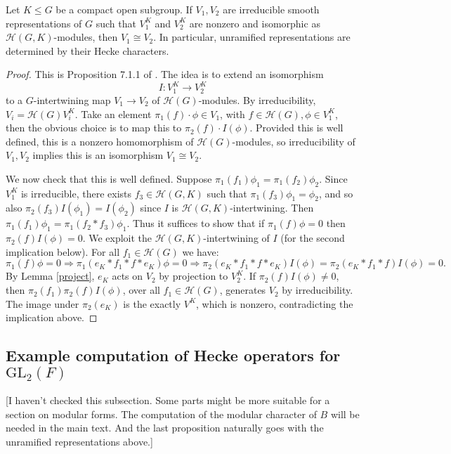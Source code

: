 \begin{prop}
    Let $K \leq G$ be a compact open subgroup. If $V_1,V_2$ are irreducible smooth representations of $G$ such that $V_1^K$ and $V_2^K$ are nonzero and isomorphic as $\mathcal H(G,K)$-modules, then $V_1 \cong V_2$. In particular, unramified representations are determined by their Hecke characters.
\end{prop}
\begin{proof}
    This is Proposition 7.1.1 of \cite{GH1}. The idea is to extend an isomorphism $$I: V_1^K \to V_2^K$$ to a $G$-intertwining map $V_1\to V_2$ of $\mathcal H(G)$-modules. By irreducibility, $V_i = \mathcal H(G)V_i^K$. Take an element $\pi_1(f) \cdot \phi \in V_1$, with $f \in \mathcal H(G), \phi \in V_1^K$, then the obvious choice is to map this to $\pi_2(f) \cdot I(\phi)$. Provided this is well defined, this is a nonzero homomorphism of $\mathcal H(G)$-modules, so irreducibility of $V_1,V_2$ implies this is an isomorphism $V_1 \cong V_2$.

    We now check that this is well defined. Suppose $\pi_1(f_1)\phi_1 = \pi_1(f_2)\phi_2$. Since $V_1^K$ is irreducible, there exists $f_3 \in \mathcal H(G,K)$ such that $\pi_1(f_3)\phi_1 = \phi_2$, and so also $\pi_2(f_3)I(\phi_1) = I(\phi_2)$ since $I$ is $\mathcal H(G,K)$-intertwining. Then $\pi_1(f_1) \phi_1 = \pi_1(f_2 * f_3) \phi_1$. Thus it suffices to show that if $\pi_1(f)\phi =0$ then $\pi_2(f)I(\phi)=0$. We exploit the $\mathcal H(G,K)$-intertwining of $I$ (for the second implication below). For all $f_1 \in \mathcal H(G)$ we have:
    $$\pi_1(f)\phi = 0 \Rightarrow \pi_1(e_K*f_1*f*e_K)\phi = 0 \Rightarrow \pi_2(e_K*f_1*f*e_K)I(\phi)=\pi_2(e_K*f_1*f)I(\phi)=0.$$
    By Lemma \ref{project}, $e_K$ acts on $V_2$ by projection to $V_2^K$. If $\pi_2(f)I(\phi) \neq 0$, then $\pi_2(f_1)\pi_2(f)I(\phi)$, over all $f_1 \in \mathcal H(G)$, generates $V_2$ by irreducibility. The image under $\pi_2(e_K)$ is the exactly $V^K$, which is nonzero, contradicting the implication above.
\end{proof}

\subsection{Example computation of Hecke operators for $\mathrm{GL}_2(F)$}

[I haven't checked this subsection. Some parts might be more suitable for a section on modular forms. The computation of the modular character of $B$ will be needed in the main text. And the last proposition naturally goes with the unramified representations above.]


